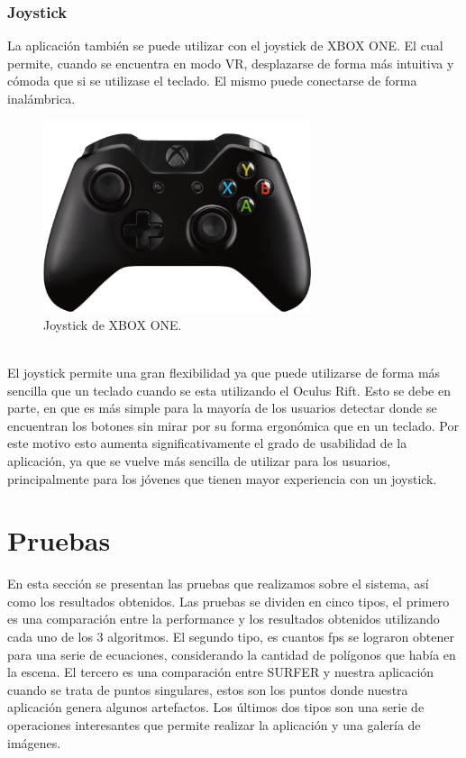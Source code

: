 \documentclass[12pt]{article}
\begin{document}
\subsubsection{Joystick}
La aplicación también se puede utilizar con el joystick de XBOX ONE. El cual permite, cuando se encuentra en modo VR, desplazarse de forma más intuitiva y cómoda que si se utilizase el teclado. El mismo puede conectarse de forma inalámbrica.\\
\begin{figure}[h!]
\includegraphics[width=0.7\textwidth,center]{joystickPosta.png}
\caption{Joystick de XBOX ONE.}
\end{figure}
\\El joystick permite una gran flexibilidad ya que puede utilizarse de forma más sencilla que un teclado cuando se esta utilizando el Oculus Rift. Esto se debe en parte, en que es más simple para la mayoría de los usuarios detectar donde se encuentran los botones sin mirar por su forma ergonómica que en un teclado. Por este motivo esto aumenta significativamente el grado de usabilidad de la aplicación, ya que se vuelve más sencilla de utilizar para los usuarios, principalmente para los jóvenes que tienen mayor experiencia con un joystick.
\clearpage
\section{Pruebas}
En esta sección se presentan las pruebas que realizamos sobre el sistema, así como los resultados obtenidos. Las pruebas se dividen en cinco tipos, el primero es una comparación entre la performance y los resultados obtenidos utilizando cada uno de los 3 algoritmos. El segundo tipo, es cuantos fps se lograron obtener para una serie de ecuaciones, considerando la cantidad de polígonos que había en la escena. El tercero es una comparación entre SURFER y nuestra aplicación cuando se trata de puntos singulares, estos son los puntos donde nuestra aplicación genera algunos artefactos. Los últimos dos tipos son una serie de operaciones interesantes que permite realizar la aplicación y una galería de imágenes.
\end{document}

